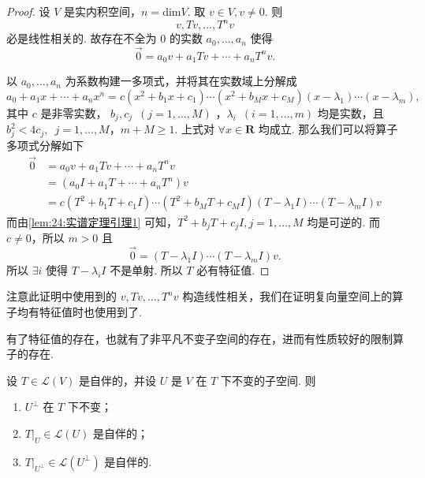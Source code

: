 \begin{proof}
    设 $ V $ 是实内积空间，$ n = \mathrm{dim} V $. 取 $ v \in V, v \neq 0 $. 则
    \[ v, Tv, \ldots , T^nv \]
    必是线性相关的. 故存在不全为 0 的实数 $ a_0, \ldots , a_n $ 使得
    \[ \vec{0} = a_0v + a_1Tv + \cdots + a_nT^nv. \]

    以 $ a_0, \ldots , a_n $ 为系数构建一多项式，并将其在实数域上分解成
    \[ a_0 + a_1x + \cdots + a_nx^n  = c(x^2 + b_1x + c_1)\cdots(x^2 + b_Mx + c_M)(x - \lambda_1)\cdots(x - \lambda_m), \]
    其中 $ c $ 是非零实数， $ b_j, c_j \enspace(j = 1, \ldots , M) $ ，$ \lambda_i \enspace(i = 1, \ldots , m) $ 均是实数，且 $ b_j^2 < 4c_j ,\enspace j = 1, \ldots , M $，$ m + M \geqslant 1 $. 上式对 $ \forall x \in \mathbf{R} $ 均成立. 那么我们可以将算子多项式分解如下
    \begin{align*}
        \vec{0} & = a_0v + a_1Tv + \cdots + a_nT^nv                                                      \\
                & = (a_0I + a_1T + \cdots + a_nT^n)v                                                     \\
                & = c(T^2 + b_1T + c_1I)\cdots(T^2 + b_MT + c_MI)(T - \lambda_1I)\cdots(T - \lambda_mI)v
    \end{align*}
    而由\autoref{lem:24:实谱定理引理1} 可知，$ T^2 + b_jT + c_jI, j = 1, \ldots , M $ 均是可逆的. 而 $ c \neq 0 $，所以 $ m > 0 $ 且
    \[ \vec{0} = (T - \lambda_1I)\cdots(T - \lambda_mI)v. \]
    所以 $ \exists i $ 使得 $ T - \lambda_iI $ 不是单射. 所以 $ T $ 必有特征值.
\end{proof}

注意此证明中使用到的 $ v, Tv, \ldots , T^nv $ 构造线性相关，我们在证明复向量空间上的算子均有特征值时也使用到了.

有了特征值的存在，也就有了非平凡不变子空间的存在，进而有性质较好的限制算子的存在.

\begin{lemma} \label{lem:24:实谱定理引理3}
    设 $ T \in \mathcal{L}(V) $ 是自伴的，并设 $ U $ 是 $ V $ 在 $ T $ 下不变的子空间. 则
    \begin{enumerate}
        \item $ U^{\perp} $ 在 $ T $ 下不变；

        \item $ T|_U \in \mathcal{L}(U) $ 是自伴的；

        \item $ T|_{U^{\perp }} \in \mathcal{L}(U^{\perp }) $ 是自伴的.
    \end{enumerate}
\end{lemma}

